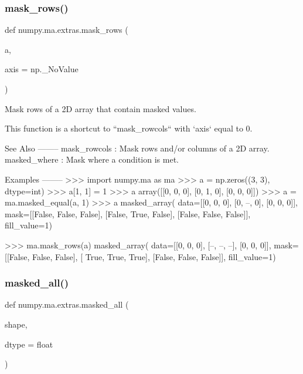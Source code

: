 \subsubsection{\texorpdfstring{mask\+\_\+rows()}{mask\_rows()}}
{\footnotesize\ttfamily def numpy.\+ma.\+extras.\+mask\+\_\+rows (\begin{DoxyParamCaption}\item[{}]{a,  }\item[{}]{axis = {\ttfamily np.\+\_\+NoValue} }\end{DoxyParamCaption})}

\begin{DoxyVerb}Mask rows of a 2D array that contain masked values.

This function is a shortcut to ``mask_rowcols`` with `axis` equal to 0.

See Also
--------
mask_rowcols : Mask rows and/or columns of a 2D array.
masked_where : Mask where a condition is met.

Examples
--------
>>> import numpy.ma as ma
>>> a = np.zeros((3, 3), dtype=int)
>>> a[1, 1] = 1
>>> a
array([[0, 0, 0],
       [0, 1, 0],
       [0, 0, 0]])
>>> a = ma.masked_equal(a, 1)
>>> a
masked_array(
  data=[[0, 0, 0],
        [0, --, 0],
        [0, 0, 0]],
  mask=[[False, False, False],
        [False,  True, False],
        [False, False, False]],
  fill_value=1)

>>> ma.mask_rows(a)
masked_array(
  data=[[0, 0, 0],
        [--, --, --],
        [0, 0, 0]],
  mask=[[False, False, False],
        [ True,  True,  True],
        [False, False, False]],
  fill_value=1)\end{DoxyVerb}
 \mbox{\label{namespacenumpy_1_1ma_1_1extras_abf272f3fd4ed8843a5aa8c6e9ccd6b76}} 
\subsubsection{\texorpdfstring{masked\+\_\+all()}{masked\_all()}}
{\footnotesize\ttfamily def numpy.\+ma.\+extras.\+masked\+\_\+all (\begin{DoxyParamCaption}\item[{}]{shape,  }\item[{}]{dtype = {\ttfamily float} }\end{DoxyParamCaption})}

